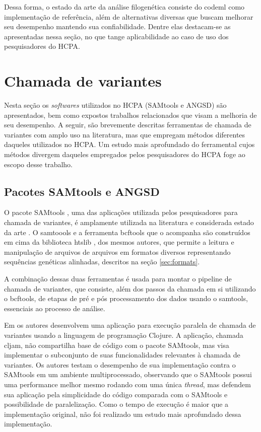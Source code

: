 \documentclass[cic,tc]{iiufrgs}
\begin{document}
Dessa forma, o estado da arte da análise filogenética consiste do codeml como
implementação de referência, além de alternativas diversas que buscam melhorar
seu desempenho mantendo sua confiabilidade. Dentre elas destacam-se as
apresentadas nessa seção, no que tange aplicabilidade ao caso de uso dos
pesquisadores do HCPA.

\section{Chamada de variantes}
\label{sec:callant}

Nesta seção os \textit{softwares} utilizados no HCPA (SAMtools e ANGSD) são
apresentados, bem como expostos trabalhos relacionados que visam a melhoria de
seu desempenho. A seguir, são brevemente descritas ferramentas de chamada de
variantes com amplo uso na literatura, mas que empregam métodos diferentes
daqueles utilizados no HCPA. Um estudo mais aprofundado do ferramental cujos
métodos divergem daqueles empregados pelos pesquisadores do HCPA foge ao escopo
desse trabalho.

\subsection{Pacotes SAMtools e ANGSD}

O pacote SAMtools \cite{li2009sequence}, uma das aplicações utilizada pelos
pesquisadores para chamada de variantes, é amplamente utilizada na literatura
\cite{danecek2021twelve} e considerada estado da arte \cite{yao2020evaluation}.
O samtoools e a ferramenta bcftools que o acompanha são construídos em cima da
biblioteca htslib \cite{bonfield2021htslib}, dos mesmos autores, que permite a
leitura e manipulação de arquivos de arquivos em formatos diversos
representando sequências genéticas alinhadas, descritos na seção
\ref{sec:formats}.

A combinação dessas duas ferramentas é usada para montar o pipeline de chamada
de variantes, que consiste, além dos passos da chamada em si utilizando o
bcftools, de etapas de pré e pós processamento dos dados usando o samtools,
essenciais ao processo de análise.

Em \cite{takeuchi2016cljam} os autores desenvolvem uma aplicação para execução
paralela de chamada de variantes usando a linguagem de programação Clojure. A
aplicação, chamada cljam, não compartilha base de código com o pacote SAMtools,
mas visa implementar o subconjunto de suas funcionalidades relevantes à
chamada de variantes. Os autores testam o desempenho de sua implementação
contra o SAMtools em um ambiente multiprocessado, observando que o SAMtools
possui uma performance melhor mesmo rodando com uma única \textit{thread}, mas defendem
sua aplicação pela simplicidade do código comparada com o SAMtools e
possibilidade de paralelização. Como o tempo de execução é maior que a
implementação original, não foi realizado um estudo mais aprofundado dessa
implementação.
\end{document}

